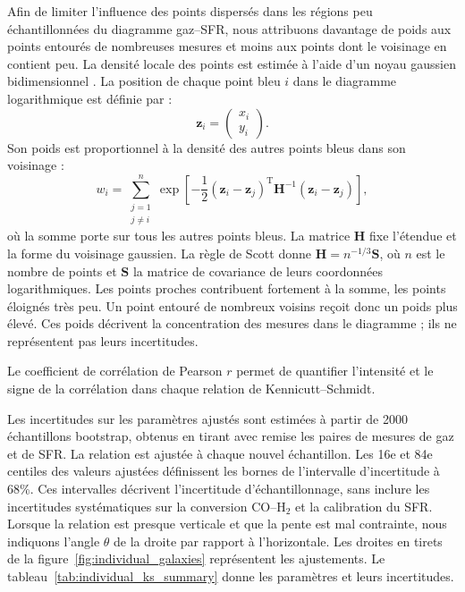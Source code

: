 Afin de limiter l'influence des points dispersés dans les régions peu échantillonnées du diagramme gaz--SFR, nous attribuons davantage de poids aux points entourés de nombreuses mesures et moins aux points dont le voisinage en contient peu. La densité locale des points est estimée à l'aide d'un noyau gaussien bidimensionnel \citep{Scott1992}. La position de chaque point bleu $i$ dans le diagramme logarithmique est définie par :
\begin{equation}
\mathbf{z}_i =
\begin{pmatrix}
x_i \\
y_i
\end{pmatrix}.
\end{equation}
Son poids est proportionnel à la densité des autres points bleus dans son voisinage :
\begin{equation}
\label{eq:ks_density_weight}
w_i = \sum_{\substack{j=1\\j\ne i}}^{n}
\exp\!\left[-\frac{1}{2}
(\mathbf{z}_i-\mathbf{z}_j)^{\mathrm{T}}
\mathbf{H}^{-1}
(\mathbf{z}_i-\mathbf{z}_j)\right],
\end{equation}
\noindent où la somme porte sur tous les autres points bleus. La matrice $\mathbf{H}$ fixe l'étendue et la forme du voisinage gaussien. La règle de Scott \citep{Scott1992} donne $\mathbf{H}=n^{-1/3}\mathbf{S}$, où $n$ est le nombre de points et $\mathbf{S}$ la matrice de covariance de leurs coordonnées logarithmiques. Les points proches contribuent fortement à la somme, les points éloignés très peu. Un point entouré de nombreux voisins reçoit donc un poids plus élevé. Ces poids décrivent la concentration des mesures dans le diagramme ; ils ne représentent pas leurs incertitudes.

Le coefficient de corrélation de Pearson $r$ permet de quantifier l'intensité et le signe de la corrélation dans chaque relation de Kennicutt--Schmidt.

Les incertitudes sur les paramètres ajustés sont estimées à partir de 2000 échantillons bootstrap, obtenus en tirant avec remise les paires de mesures de gaz et de SFR. La relation est ajustée à chaque nouvel échantillon. Les 16e et 84e centiles des valeurs ajustées définissent les bornes de l'intervalle d'incertitude à 68\%. Ces intervalles décrivent l'incertitude d'échantillonnage, sans inclure les incertitudes systématiques sur la conversion CO--H$_2$ et la calibration du SFR. Lorsque la relation est presque verticale et que la pente est mal contrainte, nous indiquons l'angle $\theta$ de la droite par rapport à l'horizontale. Les droites en tirets de la figure~\ref{fig:individual_galaxies} représentent les ajustements. Le tableau~\ref{tab:individual_ks_summary} donne les paramètres et leurs incertitudes.
